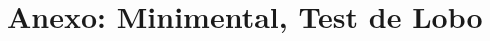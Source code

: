 
\chapter{Anexo: Minimental, Test de Lobo}
\label{aped.A}

\begin{figure}[!ht]

\end{figure}



\newpage
